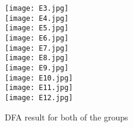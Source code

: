 \begin{figure}[!htbp]
%
\centering
\texttt{[image: E3.jpg]}\\
\texttt{[image: E4.jpg]}\\
\texttt{[image: E5.jpg]}\\
\texttt{[image: E6.jpg]}\\
\texttt{[image: E7.jpg]}\\
\subcaption{}
\endminipage\hfill
{}%
\centering
\texttt{[image: E8.jpg]}\\
\texttt{[image: E9.jpg]}\\
\texttt{[image: E10.jpg]}\\
\texttt{[image: E11.jpg]}\\
\texttt{[image: E12.jpg]}\\
\subcaption{}
\endminipage\hfill
\caption{DFA result for both of the groups}
\end{figure}



